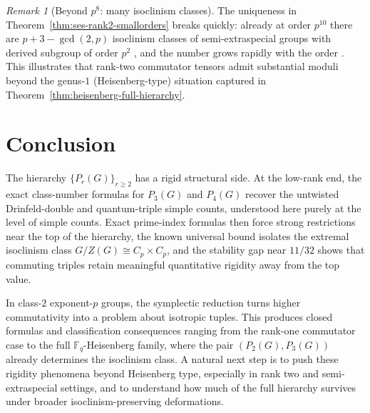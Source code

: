 \documentclass[11pt]{article}
\theoremstyle{definition}
\theoremstyle{remark}
\newtheorem{remark}[theorem]{Remark}
\theoremstyle{definition}
\theoremstyle{plain}
\begin{document}
\begin{remark}[Beyond $p^8$: many isoclinism classes]\label{rem:ses-many}
The uniqueness in Theorem~\ref{thm:ses-rank2-smallorders} breaks quickly: already at order $p^{10}$ there are
$p+3-\gcd(2,p)$ isoclinism classes of semi-extraspecial groups with derived subgroup of order $p^2$
\cite[Theorem~1.2]{LewisMaglione2018}, and the number grows rapidly with the order \cite[Theorem~1.3]{LewisMaglione2018}.
This illustrates that rank-two commutator tensors admit substantial moduli beyond the genus-$1$ (Heisenberg-type) situation
captured in Theorem~\ref{thm:heisenberg-full-hierarchy}.
\end{remark}

\section{Conclusion}

The hierarchy $\{P_r(G)\}_{r\ge2}$ has a rigid structural side. At the low-rank end, the exact class-number formulas for $P_3(G)$ and $P_4(G)$ recover the untwisted Drinfeld-double and quantum-triple simple counts, understood here purely at the level of simple counts. Exact prime-index formulas then force strong restrictions near the top of the hierarchy, the known universal bound isolates the extremal isoclinism class $G/Z(G)\cong C_p\times C_p$, and the stability gap near $11/32$ shows that commuting triples retain meaningful quantitative rigidity away from the top value.

In class-$2$ exponent-$p$ groups, the symplectic reduction turns higher commutativity into a problem about isotropic tuples. This produces closed formulas and classification consequences ranging from the rank-one commutator case to the full $\mathbb F_q$-Heisenberg family, where the pair $(P_2(G),P_3(G))$ already determines the isoclinism class. A natural next step is to push these rigidity phenomena beyond Heisenberg type, especially in rank two and semi-extraspecial settings, and to understand how much of the full hierarchy survives under broader isoclinism-preserving deformations.
\end{document}
